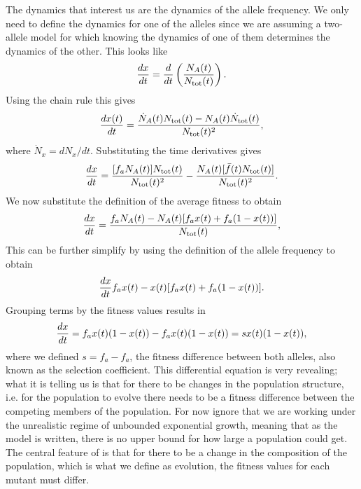 The dynamics that interest us are the dynamics of the allele frequency. We only
need to define the dynamics for one of the alleles since we are assuming a
two-allele model for which knowing the dynamics of one of them determines the
dynamics of the other. This looks like
\begin{equation}
  {d{x} \over dt} = {d{} \over dt}\left( {N_A(t) \over N_{\text{tot}}(t)} \right).
\end{equation}
Using the chain rule this gives
\begin{equation}
  {d{x(t)} \over dt} = {\dot{N}_A(t) N_{\text{tot}}(t) - N_A(t) \dot{N}_{\text{tot}}(t) \over N_{\text{tot}}(t)^2},
\end{equation}
where $\dot{N}_x = dN_x / dt$. Substituting the time derivatives gives
\begin{equation}
  {d{x} \over dt} = {[f_a N_A(t)] N_{\text{tot}}(t) \over N_{\text{tot}}(t)^2} -
           {N_A(t)[\bar{f}(t) N_{\text{tot}}(t)] \over N_{\text{tot}}(t)^2}.
\end{equation}
We now substitute the definition of the average fitness to obtain
\begin{equation}
  {d{x} \over dt} = {f_a N_A(t) - 
           N_A(t) [f_a x(t) + f_a (1 - x(t))]
          \over N_{\text{tot}}(t)},
\end{equation}
This can be further simplify by using the definition of the allele frequency to
obtain
\begin{equation}
  {d{x} \over dt} f_a x(t) - x(t)[f_a x(t) + f_a (1 - x(t))].
\end{equation}
Grouping terms by the fitness values results in
\begin{equation}
  {d{x} \over dt} = f_a x(t)(1 - x(t)) - f_a x(t)(1 - x(t))
  = s x(t)(1 - x(t)),
  \label{eq_freq_dynamics_selection}
\end{equation}
where we defined $s = f_a - f_a$, the fitness difference between both alleles,
also known as the selection coefficient. This differential equation is very
revealing; what it is telling us is that for there to be changes in the
population structure, i.e. for the population to evolve there needs to be a
fitness difference between the competing members of the population. For now
ignore that we are working under the unrealistic regime of unbounded
exponential growth, meaning that as the model is written, there is no upper
bound for how large a population could get. The central feature of
 is that for there to be a change in the
composition of the population, which is what we define as evolution, the
fitness values for each mutant must differ. 

